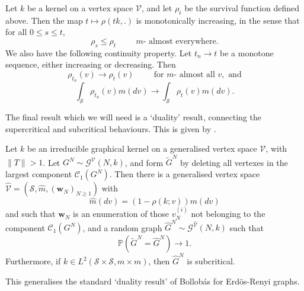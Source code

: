    \begin{theorem}\label{thrm: continuity of rho} Let $k$ be a kernel on a vertex space $\mathcal{V}$, and let $\rho_t$ be the survival function defined above. Then the map $t\mapsto \rho(tk, .)$ is monotonically increasing, in the sense that for all $0\leq s \leq t$, \begin{equation}
          \rho_s \leq \rho_t \hspace{1cm}m \text{- almost everywhere}.
      \end{equation} We also have the following continuity property. Let $t_n\rightarrow t$ be a monotone sequence, either increasing or decreasing. Then \begin{equation}
       \rho_{t_n}(v)\rightarrow \rho_t(v) \hspace{1cm} \text{for $m$- almost all }v, \text{ and}
   \end{equation} \begin{equation}
       \int_{\mathcal{S}}\rho_{t_n}(v)m(dv)\rightarrow \int_{\mathcal{S}}\rho_t(v)m(dv).
   \end{equation} \end{theorem} The final result which we will need is a `duality' result, connecting the supercritical and subcritical behaviours. This is given by \cite[Theorem 12.1]{BJR07}.
   \begin{theorem}\label{thrm: coupling supercritical and subcritical} Let $k$ be an irreducible graphical kernel on a generalised vertex space $\mathcal{V}$, with $\|T\|>1$. Let $G^N \sim \mathcal{G}^\mathcal{V}(N, k)$, and form $\widetilde{G}^N$ by deleting all vertexes in the largest component $\mathcal{C}_1(G^N).$ Then there is a generalised vertex space $\widehat{\mathcal{V}}=(\mathcal{S}, \widehat{m}, (\mathbf{w}_N)_{N\geq 1})$ with \begin{equation}
       \widehat{m}(dv)=(1-\rho(k;v))m(dv)
   \end{equation} and such that $\mathbf{w}_N$ is an enumeration of those $v^{(i)}_N$ not belonging to the component $\mathcal{C}_1(G^N)$, and a random graph $\widehat{G}^N \sim \mathcal{G}^{\widehat{\mathcal{V}}}(N,k)$ such that \begin{equation}
       \mathbb{P}(\widetilde{G}^N=\widehat{G}^N)\rightarrow 1.
   \end{equation}  Furthermore, if $k\in L^2(\mathcal{S}\times \mathcal{S}, m\times m)$, then $\widehat{G}^N$ is subcritical.\end{theorem} This generalises the standard `duality result' of Bollob\'as \cite{BB84} for Erd\"os-Renyi graphs. 